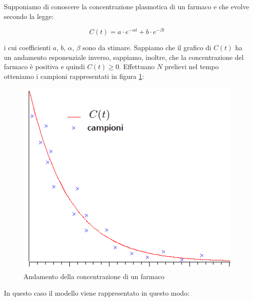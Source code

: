 \begin{esempio} %
Supponiamo di conoscere la concentrazione plasmotica di un farmaco e che evolve secondo la legge:

  \[ C(t)=a \cdot e^{-\alpha t}+b \cdot e^{-\beta t} \]
  
i cui coefficienti $a$, $b$, $\alpha$, $\beta$ sono da stimare.
Sappiamo che il grafico di $C(t)$ ha un andamento esponenziale inverso, sappiamo, inoltre, che la concentrazione del farmaco è positiva e quindi $C(t)\geq 0$. Effettuano $N$ prelievi nel tempo otteniamo i campioni rappresentati in figura \ref{fig:concfarmaco}:

\begin{figure}[htbp]
  \centering
  \includegraphics[scale=0.5]{img/cdt.png}
  \caption{Andamento della concentrazione di un farmaco\label{fig:concfarmaco}}
\end{figure}

In questo caso il modello viene rappresentato in questo modo:


\end{esempio}
